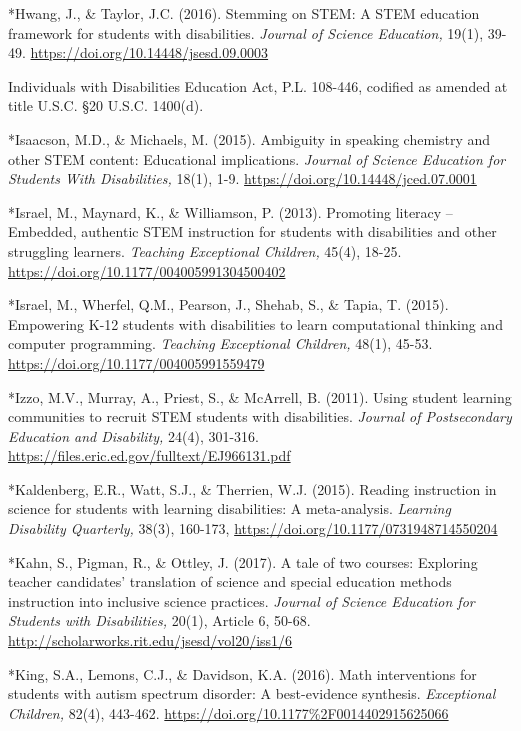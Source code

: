 \documentclass[11.5pt]{sig-alternate}
\begin{document}
*Hwang, J., \& Taylor, J.C. (2016). Stemming on STEM: A STEM education framework for students with disabilities. \textit{Journal of Science Education,} 19(1), 39-49. \url{https://doi.org/10.14448/jsesd.09.0003}

Individuals with Disabilities Education Act, P.L. 108-446, codified as amended at title U.S.C. §20 U.S.C. 1400(d).  

*Isaacson, M.D., \& Michaels, M. (2015). Ambiguity in speaking chemistry and other STEM content: Educational implications. \textit{Journal of Science Education for Students With Disabilities,} 18(1), 1-9. \url{https://doi.org/10.14448/jced.07.0001}

*Israel, M., Maynard, K., \& Williamson, P. (2013). Promoting literacy – Embedded, authentic STEM instruction for students with disabilities and other struggling learners. \textit{Teaching Exceptional Children,} 45(4), 18-25. \url{https://doi.org/10.1177/004005991304500402}

*Israel, M., Wherfel, Q.M., Pearson, J., Shehab, S., \& Tapia, T. (2015). Empowering K-12 students with disabilities to learn computational thinking and computer programming. \textit{Teaching Exceptional Children,} 48(1), 45-53. \url{https://doi.org/10.1177/004005991559479}

*Izzo, M.V., Murray, A., Priest, S., \& McArrell, B. (2011). Using student learning communities to recruit STEM students with disabilities. \textit{Journal of Postsecondary Education and Disability,} 24(4), 301-316. \url{https://files.eric.ed.gov/fulltext/EJ966131.pdf}

*Kaldenberg, E.R., Watt, S.J., \& Therrien, W.J. (2015). Reading instruction in science for students with learning disabilities: A meta-analysis. \textit{Learning Disability Quarterly,} 38(3), 160-173, \url{https://doi.org/10.1177/0731948714550204}

*Kahn, S., Pigman, R., \& Ottley, J. (2017). A tale of two courses: Exploring teacher candidates’ translation of science and special education methods instruction into inclusive science practices. \textit{Journal of Science Education for Students with Disabilities,} 20(1), Article 6, 50-68. \url{http://scholarworks.rit.edu/jsesd/vol20/iss1/6}

*King, S.A., Lemons, C.J., \& Davidson, K.A. (2016). Math interventions for students with autism spectrum disorder: A best-evidence synthesis. \textit{Exceptional Children,} 82(4), 443-462. \url{https://doi.org/10.1177\%2F0014402915625066}
\end{document}
